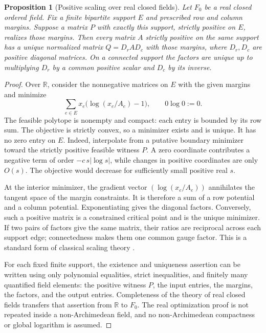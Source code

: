 \documentclass[11pt,a4paper]{article}
\numberwithin{equation}{section}
\newtheorem{proposition}[theorem]{Proposition}
\theoremstyle{definition}
\newcommand{\R}{\mathbb R}
\begin{document}
\begin{proposition}[Positive scaling over real closed fields]
\label{scale:prop:global}
Let $F_0$ be a real closed ordered field. Fix a finite bipartite
support $E$ and prescribed row and column margins. Suppose a matrix
$P$ with exactly this support, strictly positive on $E$, realizes
those margins. Then every matrix $A$ strictly positive on the same
support has a unique normalized matrix
$Q=D_r A D_c$ with those margins, where $D_r,D_c$ are positive
diagonal matrices. On a connected support the factors are unique
up to multiplying $D_r$ by a common positive scalar and $D_c$ by
its inverse.
\end{proposition}
\begin{proof}
Over $\R$, consider the nonnegative matrices on $E$ with the given
margins and minimize
\[
 \sum_{e\in E} x_e\bigl(\log(x_e/A_e)-1\bigr),
 \qquad 0\log0:=0.
\]
The feasible polytope is nonempty and compact: each entry is bounded
by its row sum. The objective is strictly convex, so a minimizer
exists and is unique. It has no zero entry on $E$. Indeed, interpolate
from a putative boundary minimizer toward the strictly positive
feasible witness $P$. A zero coordinate contributes a negative
term of order $-c\,s|\log s|$, while changes in positive coordinates
are only $O(s)$. The objective would decrease for sufficiently
small positive real $s$.

At the interior minimizer, the gradient vector
$(\log(x_e/A_e))$ annihilates the tangent space of the margin
constraints. It is therefore a sum of a row potential and a column
potential. Exponentiating gives the diagonal factors. Conversely,
such a positive matrix is a constrained critical point and is the
unique minimizer. If two pairs of factors give the same matrix,
their ratios are reciprocal across each support edge; connectedness
makes them one common gauge factor. This is a standard form of
classical scaling theory \cite{Idel,SGG}.

For each fixed finite support, the existence and uniqueness assertion
can be written using only polynomial equalities, strict inequalities,
and finitely many quantified field elements: the positive witness
$P$, the input entries, the margins, the factors, and the output
entries. Completeness of the theory of real closed fields \cite{Tarski} transfers
that assertion from $\R$ to $F_0$. The real optimization proof is
not repeated inside a non-Archimedean field, and no non-Archimedean
compactness or global logarithm is assumed.
\end{proof}
\end{document}
